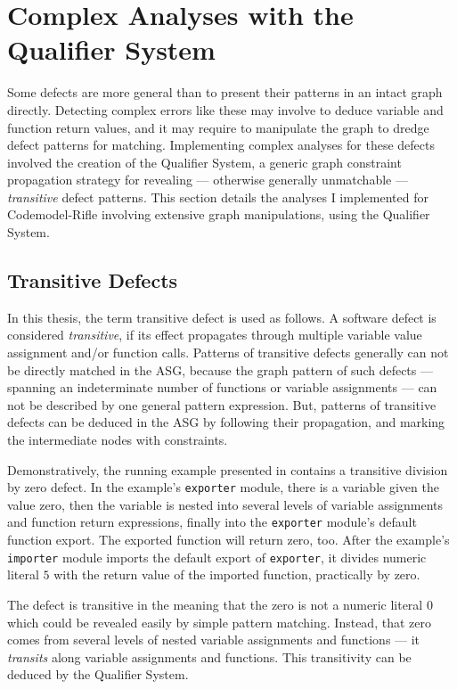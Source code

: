 \section{Complex Analyses with the Qualifier System}

Some defects are more general than to present their patterns in an intact graph directly. Detecting complex errors like these may involve to deduce variable and function return values, and it may require to manipulate the graph to dredge defect patterns for matching. Implementing complex analyses for these defects involved the creation of the Qualifier System, a generic graph constraint propagation strategy for revealing — otherwise generally unmatchable — \emph{transitive} defect patterns. This section details the analyses I implemented for Codemodel-Rifle involving extensive graph manipulations, using the Qualifier System.


\subsection{Transitive Defects}

In this thesis, the term transitive defect is used as follows. A software defect is considered \emph{transitive}, if its effect propagates through multiple variable value assignment and/or function calls. Patterns of transitive defects generally can not be directly matched in the ASG, because the graph pattern of such defects — spanning an indeterminate number of functions or variable assignments — can not be described by one general pattern expression. But, patterns of transitive defects can be deduced in the ASG by following their propagation, and marking the intermediate nodes with constraints.

Demonstratively, the running example presented in  contains a transitive division by zero defect. In the example's \lstinline{exporter} module, there is a variable given the value zero, then the variable is nested into several levels of variable assignments and function return expressions, finally into the \lstinline{exporter} module's default function export. The exported function will return zero, too. After the example's \lstinline{importer} module imports the default export of \lstinline{exporter}, it divides numeric literal $5$ with the return value of the imported function, practically by zero.

The defect is transitive in the meaning that the zero is not a numeric literal $0$ which could be revealed easily by simple pattern matching. Instead, that zero comes from several levels of nested variable assignments and functions — it \emph{transits} along variable assignments and functions. This transitivity can be deduced by the Qualifier System.

